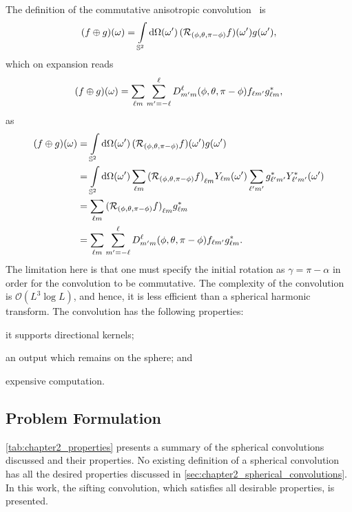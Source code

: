 The definition of the commutative anisotropic convolution~\cite{Sadeghi2012,Khalid2012} is
%
\begin{equation}
	\pixel{(f \oplus g)}
	= \integrateSphere{\omega'} \pixel[']{(\rotation{(\phi,\theta,\pi-\phi)}f)} \pixel[']{g},
\end{equation}
%
which on expansion reads
%
\begin{equation}
	\pixel{(f \oplus g)}
	= \harmonicSum \sum\limits_{m'=-\ell}^{\ell} \wigner{\ell}{m'}{m}(\phi,\theta,\pi-\phi) f_{\ell m'} \conj{\harmonic{g}},
\end{equation}
%
as
%
\begin{align}
	\pixel{(f \oplus g)}
	 & = \integrateSphere{\omega'} \pixel[']{(\rotation{(\phi,\theta,\pi-\phi)}f)} \pixel[']{g} \nonumber{}                                                                                                  \\
	 & = \integrateSphere{\omega'} \harmonicSum \harmonic{(\rotation{(\phi,\theta,\pi-\phi)}f)} \pixel[']{\harmonic{Y}} \harmonicSum['] \conj{\harmonic[']{g}} \pixel[']{\conj{\harmonic[']{Y}}} \nonumber{} \\
	 & = \harmonicSum \harmonic{(\rotation{(\phi,\theta,\pi-\phi)}f)} \conj{\harmonic{g}} \nonumber{}                                                                                                        \\
	 & = \harmonicSum \sum\limits_{m'=-\ell}^{\ell} \wigner{\ell}{m'}{m}(\phi,\theta,\pi-\phi) f_{\ell m'} \conj{\harmonic{g}}.
\end{align}
%
The limitation here is that one must specify the initial rotation as \({\gamma=\pi-\alpha}\) in order for the convolution to be commutative.
The complexity of the convolution is \(\mathcal{O}(L^{3}\log{L})\), and hence, it is less efficient than a spherical harmonic transform.
The convolution has the following properties:
%
\begin{inparaenum}[(i)]
	\item it supports directional kernels;
	\item an output which remains on the sphere; and
	\item expensive computation.
\end{inparaenum}

\subsection{Problem Formulation}

\cref{tab:chapter2_properties} presents a summary of the spherical convolutions discussed and their properties.
No existing definition of a spherical convolution has all the desired properties discussed in \cref{sec:chapter2_spherical_convolutions}.
In this work, the sifting convolution, which satisfies all desirable properties, is presented.


